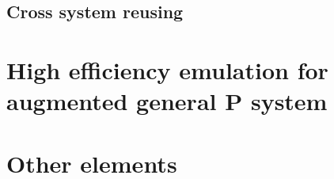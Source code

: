 \documentclass[9pt,a4paper,twoside]{article}
\begin{document}
    
\subsection{Cross system reusing}
        

\section{High efficiency emulation for augmented general P system}


\section{Other elements}

        

\printbibliography

\end{document}
